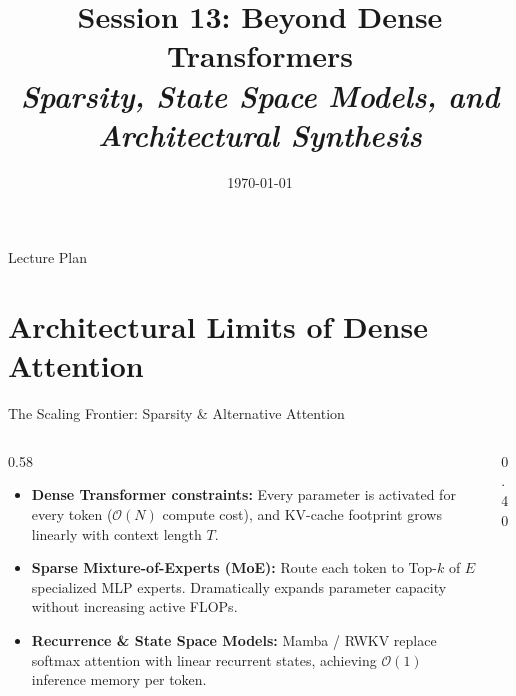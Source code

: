 \documentclass[handout]{beamer}
\title[TLM -- Session 13]{Session 13: Beyond Dense Transformers\\[4pt]
\normalsize\itshape Sparsity, State Space Models, and Architectural Synthesis}
\date{\today}
\begin{document}
\makelecturetitle

\begin{frame}{Lecture Plan}
  \tableofcontents
\end{frame}

\section{Architectural Limits of Dense Attention}

\begin{frame}{The Scaling Frontier: Sparsity \& Alternative Attention}
  \begin{columns}[c]
    \begin{column}{0.58\linewidth}
      \small
      \begin{itemize}
        \setlength{\itemsep}{5pt}
        \item \textbf{Dense Transformer constraints:}\; Every parameter is activated for every token ($\mathcal{O}(N)$ compute cost), and KV-cache footprint grows linearly with context length $T$.
        \item \textbf{Sparse Mixture-of-Experts (MoE):}\; Route each token to Top-$k$ of $E$ specialized MLP experts. Dramatically expands parameter capacity without increasing active FLOPs.
        \item \textbf{Recurrence \& State Space Models:}\; Mamba / RWKV replace softmax attention with linear recurrent states, achieving $\mathcal{O}(1)$ inference memory per token.
      \end{itemize}
    \end{column}
    \begin{column}{0.40\linewidth}
      \centering
    \end{column}
  \end{columns}
\end{frame}
\end{document}
